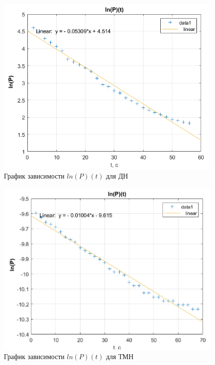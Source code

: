 \documentclass[a4paper, 12pt]{article} %
\begin{document}
\begin{figure}[h]
    \centering
    \includegraphics[width = 11 cm]{graph1}
    \caption{График зависимости $ln(P)(t)$ для ДН}
     \label{fig:vac}
\end{figure}

\begin{figure}[h]
    \centering
    \includegraphics[width = 11 cm]{graph2}
    \caption{График зависимости $ln(P)(t)$ для ТМН}
    \label{fig:vac}
\end{figure}









 
\end{document}
